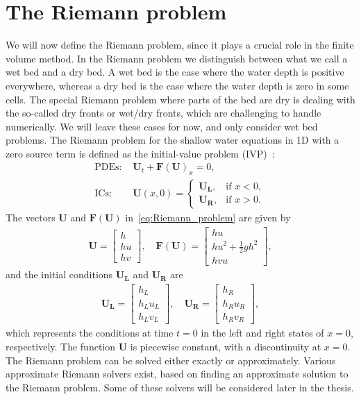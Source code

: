 \section{The Riemann problem}
We will now define the Riemann problem, since it plays a crucial role in the finite volume method.
In the Riemann problem we distinguish between what we call a wet bed and a dry bed. 
A wet bed is the case where the water depth is positive everywhere, whereas a dry bed is the case where the water depth is zero in some cells.
The special Riemann problem where parts of the bed are dry is dealing with the so-called dry fronts or wet/dry fronts, which are challenging to handle numerically.
We will leave these cases for now, and only consider wet bed problems.
The Riemann problem for the shallow water equations in 1D with a zero source term is defined as the initial-value problem (IVP)~\cite{Toro2024}:
\begin{equation}\label{eq:Riemann_problem}
    \begin{aligned}
        \text{PDEs: } &\mathbf{U}_t + {\mathbf{F(U)}}_x = 0, \\
        \text{ICs: } &\mathbf{U}(x, 0) = \begin{cases}
            \mathbf{U_L}, & \text{if  } x < 0, \\
            \mathbf{U_R}, & \text{if  } x > 0.
        \end{cases}
    \end{aligned}
    \end{equation}
The vectors $\mathbf{U}$ and $\mathbf{F(U)}$ in~\eqref{eq:Riemann_problem} are given by
\begin{align}
    \mathbf{U} = \begin{bmatrix}
        h \\ hu \\ hv
    \end{bmatrix}, \quad
    \mathbf{F(U)} = \begin{bmatrix}
        hu \\ hu^2 + \frac{1}{2}gh^2 \\ hvu
    \end{bmatrix},
\end{align}
and the initial conditions $\mathbf{U_L}$ and $\mathbf{U_R}$ are
\begin{align*}
    \mathbf{U_L} = \begin{bmatrix}
        h_L \\ h_L u_L \\ h_L v_L
    \end{bmatrix}, \quad 
    \mathbf{U_R} = \begin{bmatrix}
        h_R \\ h_R u_R \\ h_R v_R
    \end{bmatrix},
\end{align*}
which represents the conditions at time $t = 0$ in the left and right states of $x=0$, respectively.
The function $\mathbf{U}$ is piecewise constant, with a discontinuity at $x=0$.
The Riemann problem can be solved either exactly or approximately.
Various approximate Riemann solvers exist, based on finding an approximate solution to the Riemann problem.
Some of these solvers will be considered later in the thesis.

